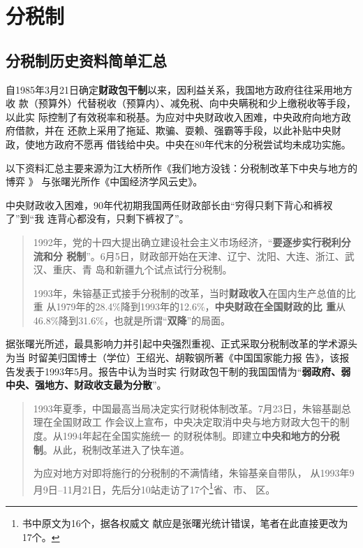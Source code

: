 \section{分税制}


\subsection{分税制历史资料简单汇总}

自1985年3月21日确定\textbf{财政包干制}以来，因利益关系，我国地方政府往往采用地方收
款（预算外）代替税收（预算内）、减免税、向中央瞒税和少上缴税收等手段，以此实
际控制了有效税率和税基。为应对中央财政收入困难，中央政府向地方政府借款，并在
还款上采用了拖延、欺骗、耍赖、强霸等手段，以此补贴中央财政，使地方政府不愿再
借钱给中央。\cite{majuncaigai}中央在80年代末的分税尝试均未成功实施。

以下资料汇总主要来源为江大桥所作《我们地方没钱：分税制改革下中央与地方的博弈 》
\cite{difangmeiqian}与张曙光所作《中国经济学风云史》。

中央财政收入困难，90年代初期我国两任财政部长由“穷得只剩下背心和裤衩了”到“我
连背心都没有，只剩下裤衩了”。

\begin{quotation}
  1992年，党的十四大提出确立建设社会主义市场经济，“\textbf{要逐步实行税利分流和分
    税制}”。6月5日，财政部开始在天津、辽宁、沈阳、大连、浙江、武汉、重庆、青
  岛和新疆九个试点试行分税制。

  1993年，朱镕基正式接手分税制的改革，当时\textbf{财政收入}在国内生产总值的比重
  从1979年的28.4\%降到1993年的12.6\%，\textbf{中央财政在全国财政的比
    重}从46.8\%降到31.6\%，也就是所谓“\textbf{双降}”的局面。
\end{quotation}

据张曙光所述，最具影响力并引起中央强烈重视、正式采取分税制改革的学术源头为当
时留美归国博士（学位）王绍光、胡鞍钢所著《中国国家能力报
告》，该报告发表于1993年5月。报告中认为当时实
行财政包干制的我国国情为“\textbf{弱政府、弱中央、强地方、财政收支最为分散}”。

\begin{quotation}
  1993年夏季，中国最高当局决定实行财税体制改革。7月23日，朱镕基副总理在全国财政工
  作会议上宣布，中央决定取消中央与地方财政大包干的制度。从1994年起在全国实施统一
  的财税体制。即建立\textbf{中央和地方的分税制}。从此，税制改革进入了快车道。

  为应对地方对即将施行的分税制的不满情绪，朱镕基亲自带队，
  从1993年9月9日--11月21日，先后分10站走访了17个\footnote{书中原文为16个，据各权威文
    献应是张曙光统计错误，笔者在此直接更改为17个。}省、市、
  区。
\end{quotation}

